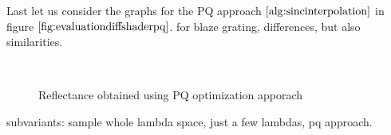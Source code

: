Last let us consider the graphs for the PQ approach $\ref{alg:sincinterpolation}$ in figure $\ref{fig:evaluationdiffshaderpq}$. for blaze grating, differences, but also similarities. 


\begin{figure}[H]
  \centering
~
\caption{Reflectance obtained using PQ optimization apporach}
\label{fig:evaluationdiffshaderpq}
\end{figure}


subvariants: sample whole lambda space, just a few lambdas, pq approach.


